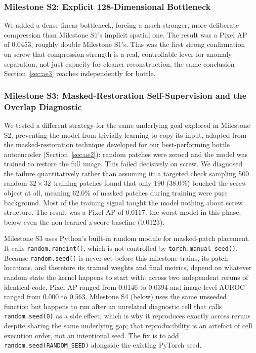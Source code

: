 \subsubsection{Milestone S2: Explicit 128-Dimensional Bottleneck}

We added a dense linear bottleneck, forcing a much stronger, more deliberate
compression than Milestone S1's implicit spatial one. The result was a Pixel
AP of 0.0453, roughly double Milestone S1's. This was the first strong
confirmation on screw that compression strength is a real, controllable lever
for anomaly separation, not just capacity for cleaner reconstruction, the same
conclusion Section~\ref{sec:ae3} reaches independently for bottle.

\subsubsection{Milestone S3: Masked-Restoration Self-Supervision and the Overlap Diagnostic}

We tested a different strategy for the same underlying goal explored in
Milestone S2, preventing the model from trivially learning to copy its input,
adapted from the masked-restoration technique developed for our
best-performing bottle autoencoder (Section~\ref{sec:ae2}): random patches were zeroed
and the model was trained to restore the full image. This failed decisively
on screw. We diagnosed the failure quantitatively rather than assuming it: a
targeted check sampling 500 random $32\times32$ training patches found that
only 190 (38.0\%) touched the screw object at all, meaning 62.0\% of masked
patches during training were pure background. Most of the training signal
taught the model nothing about screw structure. The result was a Pixel AP of
0.0117, the worst model in this phase, below even the non-learned z-score
baseline (0.0123).

Milestone S3 uses Python's built-in random module for masked-patch placement.
It calls \texttt{random.randint()}, which is not controlled by
\texttt{torch.manual\_seed()}. Because \texttt{random.seed()} is never set before this milestone trains, its patch
locations, and therefore its trained weights and final metrics, depend on
whatever random state the kernel happens to start with: across two
independent reruns of identical code, Pixel AP ranged from 0.0146 to 0.0394
and image-level AUROC ranged from 0.000 to 0.563. Milestone S4 (below) uses
the same unseeded function but happens to run after an unrelated
diagnostic cell that calls \texttt{random.seed(0)} as a side effect, which
is why it reproduces exactly across reruns despite sharing the same
underlying gap; that reproducibility is an artefact of cell execution
order, not an intentional seed. The fix is to add
\texttt{random.seed(RANDOM\_SEED)} alongside the existing PyTorch seed.

